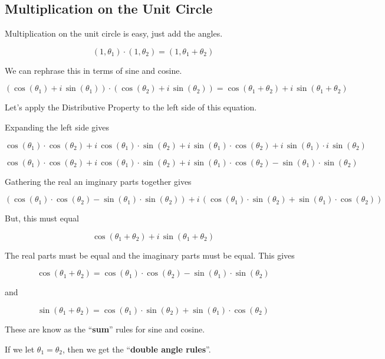 \documentclass{ximera}
\begin{document}
\subsection*{Multiplication on the Unit Circle}

Multiplication on the unit circle is easy, just add the angles.



\[ (1, \theta_1) \cdot (1, \theta_2) = (1, \theta_1 + \theta_2)   \]


We can rephrase this in terms of sine and cosine.



\[ 
(\cos(\theta_1) + i \, \sin(\theta_1)) \cdot (\cos(\theta_2) + i \, \sin(\theta_2)) = \cos(\theta_1 + \theta_2) + i \, \sin(\theta_1 + \theta_2)
\]



Let's apply the Distributive Property to the left side of this equation.

Expanding the left side gives


\[ \cos(\theta_1) \cdot \cos(\theta_2) + i \, \cos(\theta_1) \cdot \sin(\theta_2) + i \, \sin(\theta_1) \cdot \cos(\theta_2) + i \, \sin(\theta_1) \cdot i \, \sin(\theta_2) \]


\[ \cos(\theta_1) \cdot \cos(\theta_2) + i \, \cos(\theta_1) \cdot \sin(\theta_2) + i \, \sin(\theta_1) \cdot \cos(\theta_2) - \sin(\theta_1) \cdot \sin(\theta_2) \]


Gathering the real an imginary parts together gives


\[
(\cos(\theta_1) \cdot \cos(\theta_2) - \sin(\theta_1) \cdot \sin(\theta_2)) + i \, (\cos(\theta_1) \cdot \sin(\theta_2) + \sin(\theta_1) \cdot \cos(\theta_2))
\]

But, this must equal 


\[ \cos(\theta_1 + \theta_2) + i \, \sin(\theta_1 + \theta_2) \]

The real parts must be equal and the imaginary parts must be equal.  This gives


\[ \cos(\theta_1 + \theta_2) =  \cos(\theta_1) \cdot \cos(\theta_2) - \sin(\theta_1) \cdot \sin(\theta_2) \]

and

\[ \sin(\theta_1 + \theta_2) =  \cos(\theta_1) \cdot \sin(\theta_2) + \sin(\theta_1) \cdot \cos(\theta_2) \]


These are know as the ``\textbf{sum}'' rules for sine  and cosine.


If we let $\theta_1 = \theta_2$, then we get the ``\textbf{double angle rules}''.
\end{document}
